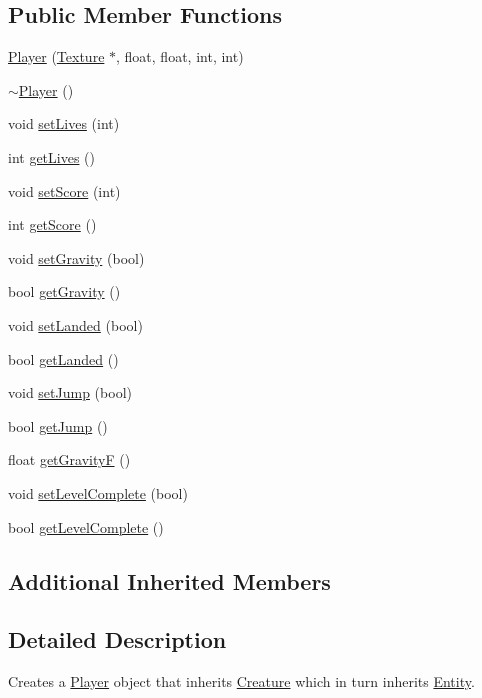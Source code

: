 \subsection*{Public Member Functions}
\begin{DoxyCompactItemize}
\item 
\hyperlink{class_player_a73d9a9d1017a68d6de107bbfb0a0c486}{Player} (\hyperlink{class_texture}{Texture} $\ast$, float, float, int, int)
\item 
\hyperlink{class_player_a749d2c00e1fe0f5c2746f7505a58c062}{$\sim$\+Player} ()
\item 
void \hyperlink{class_player_a565d4df3c32d00243b1ef16dfd6e5e03}{set\+Lives} (int)
\item 
int \hyperlink{class_player_af56ac33b9b2ebd9f97c8a6f485cf2d47}{get\+Lives} ()
\item 
void \hyperlink{class_player_aa054ea95ca73dd19036d2917b29ab021}{set\+Score} (int)
\item 
int \hyperlink{class_player_a97e5447778ae6c384eedc532dcd8431d}{get\+Score} ()
\item 
void \hyperlink{class_player_a36a300f4f62fae25747c4301a81c5a10}{set\+Gravity} (bool)
\item 
bool \hyperlink{class_player_a7f8e925cef6578c511f0b215f309d814}{get\+Gravity} ()
\item 
void \hyperlink{class_player_a3474c047c1495322742b79a43381bc32}{set\+Landed} (bool)
\item 
bool \hyperlink{class_player_acda5f8d74dcb44e5ebc12003104ec0ef}{get\+Landed} ()
\item 
void \hyperlink{class_player_a282bc0d3c7341a9727bcb16cd902c953}{set\+Jump} (bool)
\item 
bool \hyperlink{class_player_a4760bc30c5c2f45c7a858496a395981f}{get\+Jump} ()
\item 
float \hyperlink{class_player_ae0ae09987c59e99aa451481bf827093c}{get\+Gravity\+F} ()
\item 
void \hyperlink{class_player_a1eb27fc807ef7557979ef23f239a46e5}{set\+Level\+Complete} (bool)
\item 
bool \hyperlink{class_player_a4305af7dca7be99eb5fb8f2002421314}{get\+Level\+Complete} ()
\end{DoxyCompactItemize}
\subsection*{Additional Inherited Members}


\subsection{Detailed Description}
Creates a \hyperlink{class_player}{Player} object that inherits \hyperlink{class_creature}{Creature} which in turn inherits \hyperlink{class_entity}{Entity}. 

